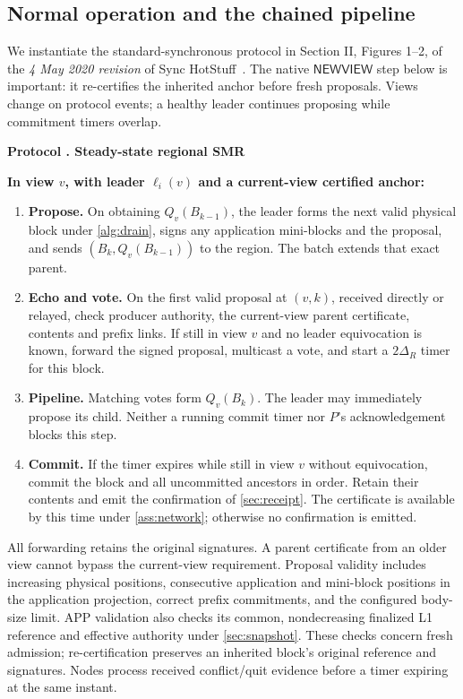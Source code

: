 \documentclass[11pt,a4paper,onecolumn]{article}
\newcommand{\Tag}[1]{\ensuremath{\mathsf{#1}}}
\newcounter{protocol}
\newenvironment{protocol}[2]{\refstepcounter{protocol}\label{#1}
\begin{mdframed}[nobreak=true,linewidth=.6pt,skipabove=9pt,skipbelow=9pt,
innertopmargin=7pt,innerbottommargin=7pt]\small
\noindent\textbf{Protocol \theprotocol. #2}\par\smallskip}{\end{mdframed}}
\begin{document}
\subsection{Normal operation and the chained pipeline}
We instantiate the standard-synchronous protocol in Section II, Figures 1--2,
of the \emph{4 May 2020 revision} of Sync HotStuff~\cite{synchotstuff}.
The native \Tag{NEWVIEW} step below is important: it re-certifies the inherited
anchor before fresh proposals. Views change on protocol events; a healthy
leader continues proposing while commitment timers overlap.

\begin{protocol}{alg:steady}{Steady-state regional SMR}
\textbf{In view $v$, with leader $\ell_i(v)$ and a current-view certified anchor:}
\begin{enumerate}[label=\textbf{S\arabic*.}]
\item \textbf{Propose.} On obtaining $Q_v(B_{k-1})$, the leader forms the
next valid physical block under \cref{alg:drain}, signs any application
mini-blocks and the proposal, and sends
$(B_k,Q_v(B_{k-1}))$ to the region. The batch extends that exact parent.
\item \textbf{Echo and vote.} On the first valid proposal at $(v,k)$, received
directly or relayed, check producer authority, the current-view parent
certificate, contents and prefix links. If still in view $v$ and no leader
equivocation is known, forward the signed proposal, multicast a vote, and
start a $2\Delta_R$ timer for this block.
\item \textbf{Pipeline.} Matching votes form $Q_v(B_k)$. The leader may
immediately propose its child. Neither a running commit timer nor $P$'s
acknowledgement blocks this step.
\item \textbf{Commit.} If the timer expires while still in view $v$ without
equivocation, commit the block and all uncommitted ancestors in order.
Retain their contents and emit the confirmation of \cref{sec:receipt}.
The certificate is available by this time under \cref{ass:network};
otherwise no confirmation is emitted.
\end{enumerate}
\end{protocol}

All forwarding retains the original signatures. A parent certificate from an
older view cannot bypass the current-view requirement. Proposal validity
includes increasing physical positions, consecutive application and
mini-block positions in the application projection, correct prefix commitments,
and the configured body-size limit. APP validation also checks its common,
nondecreasing finalized L1 reference and effective authority under
\cref{sec:snapshot}. These checks concern fresh admission; re-certification
preserves an inherited block's original reference and signatures.
Nodes process received conflict/quit
evidence before a timer expiring at the same instant.
\end{document}
